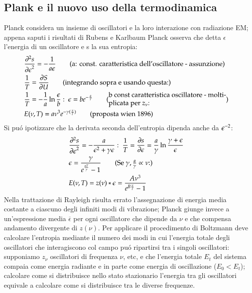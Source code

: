             \subsection{Plank e il nuovo uso della termodinamica}
                Planck considera un insieme di oscillatori e la loro interazione con radiazione EM; appena saputi i risultati di Rubens e Karlbaum Planck osserva che detta $\epsilon$ l'energia di un oscillatore e s la sua entropia:
                \begin{align*}
                    &\PtwoDy{\epsilon}{s}=-\frac{1}{a\epsilon}\tag{a: const. caratteristica dell'oscillatore - assunzione}\\
                    &\frac{1}{T}=\PDy{U}{S}\tag{integrando sopra e usando questa:}\\
                    &\frac{1}{T}=-\frac{1}{a}\ln{\frac{\epsilon}{b}}:\ \epsilon=b\exp{-\frac{a}{T}}\tag{\begin{minipage}{0.5\textwidth}b const caratteristica oscillatore - moltiplicata per $z_{\nu}$:\end{minipage}}\\
                    &E(\nu,T)=a\nu^3\exp{-\gamma(\frac{\nu}{T})}\tag{proposta wien 1896}
                \end{align*}
                Si pu\'o ipotizzare che la derivata seconda dell'entropia dipenda anche da $\epsilon^{-2}$:
                \begin{align*}
                    &\PtwoDy{\epsilon}{s}=-\frac{a}{\epsilon^2+\gamma\epsilon}:\ \frac{1}{T}=\PDy{\epsilon}{s}=\frac{a}{\gamma}\ln{\frac{\gamma+\epsilon}{\epsilon}}\\
                    &\epsilon=\frac{\gamma}{\exp{\frac{aT}{\gamma}}-1}\tag{Se $\gamma,\frac{a}{\gamma}\propto\nu$:}\\
                    &E(\nu,T)=z(\nu)*\epsilon=\frac{A\nu^3}{\exp{B \frac{\nu}{T}}-1}
                \end{align*}
                Nella trattazione di Rayleigh risulta errato l'assegnazione di energia media costante a ciascuno degli infiniti modi di vibrazione; Planck giunge invece a un'espressione media $\overbar{\epsilon}$ per ogni oscillatore che dipende da $\nu$ e che compensa andamento divergente di $z(\nu)$. Per applicare il procedimento di Boltzmann deve calcolare l'entropia mediante il numero dei modi in cui l'energia totale degli oscillatori che interagiscono col campo pu\'o ripartirsi tra i singoli oscillatori: supponiamo $z_{\nu}$ oscillatori di frequenza $\nu$, etc, e che l'energia totale $E_t$ del sistema compaia come energia radiante e in parte come energia di oscillazione ($E_0<E_t$); calcolare come si distribuisce nello stato stazionario l'energia tra gli oscillatori equivale a calcolare come si distribuisce tra le diverse frequenze.
